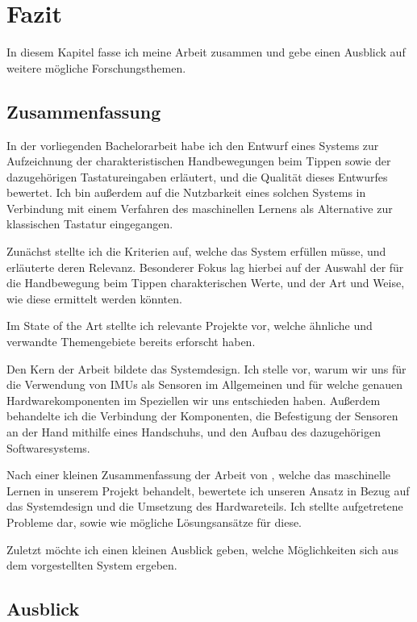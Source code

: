 \chapter{Fazit} 

In diesem Kapitel fasse ich meine Arbeit zusammen und gebe einen Ausblick auf
weitere mögliche Forschungsthemen.

\section{Zusammenfassung}

In der vorliegenden Bachelorarbeit habe ich den Entwurf eines Systems zur
Aufzeichnung der charakteristischen Handbewegungen beim Tippen sowie der
dazugehörigen Tastatureingaben erläutert, und die Qualität dieses Entwurfes
bewertet. Ich bin außerdem auf die Nutzbarkeit eines solchen Systems in
Verbindung mit einem Verfahren des maschinellen Lernens als Alternative zur
klassischen Tastatur eingegangen.

Zunächst stellte ich die Kriterien auf, welche das System erfüllen müsse, und
erläuterte deren Relevanz. Besonderer Fokus lag hierbei auf der Auswahl der für
die Handbewegung beim Tippen charakterischen Werte, und der Art und Weise, wie
diese ermittelt werden könnten.

Im State of the Art stellte ich relevante Projekte vor, welche ähnliche und
verwandte Themengebiete bereits erforscht haben.

Den Kern der Arbeit bildete das Systemdesign. Ich stelle vor, warum wir uns für
die Verwendung von IMUs als Sensoren im Allgemeinen und für welche genauen
Hard\-ware\-kom\-po\-nen\-ten im Speziellen wir uns entschieden haben. Außerdem
behandelte ich die Verbindung der Komponenten, die Befestigung der Sensoren an
der Hand mithilfe eines Handschuhs, und den Aufbau des dazugehörigen
Softwaresystems.

Nach einer kleinen Zusammenfassung der Arbeit von \citet{caro}, welche das
maschinelle Lernen in unserem Projekt behandelt, bewertete ich unseren Ansatz
in Bezug auf das Systemdesign und die Umsetzung des Hardwareteils. Ich stellte
aufgetretene Probleme dar, sowie wie mögliche Lösungsansätze für diese.

Zuletzt möchte ich einen kleinen Ausblick geben, welche Möglichkeiten sich aus
dem vorgestellten System ergeben.

\section{Ausblick}

